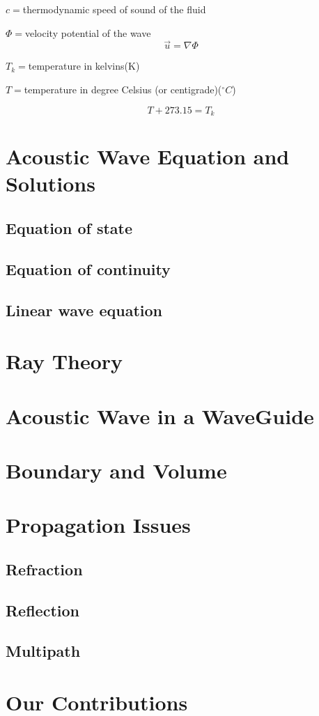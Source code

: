 $c=$thermodynamic speed of sound of the fluid

$\Phi=$velocity potential of the wave
\begin{equation}
\vec{u}=\nabla\Phi
\end{equation}

$T_k=$temperature in kelvins(K)

$T=$temperature in degree Celsius (or centigrade)($^\circ C$)

\begin{equation}
T+273.15=T_k
\end{equation}

\section{Acoustic Wave Equation and Solutions}
\subsection{Equation of state}

\subsection{Equation of continuity}
\subsection{Linear wave equation}
\section{Ray Theory}

\section{Acoustic Wave in a WaveGuide}
\section{Boundary and Volume}
\section{Propagation Issues}
\subsection{Refraction}
\subsection{Reflection}
\subsection{Multipath}
\section{Our Contributions}
